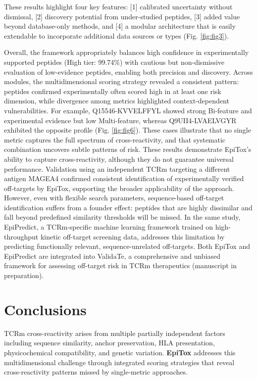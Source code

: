 \documentclass[times, twoside, watermark]{zHenriquesLab-StyleBioRxiv}
\begin{document}
    These results highlight four key features: [1] calibrated uncertainty without dismissal, [2] discovery potential from under-studied peptides, [3] added value beyond database-only methods, and [4] a modular architecture that is easily extendable to incorporate additional data sources or types (Fig. \ref{fig:fig3}). 
    
    Overall, the framework appropriately balances high confidence in experimentally supported peptides (High tier: 99.74\%) with cautious but non-dismissive evaluation of low-evidence peptides, enabling both precision and discovery.
    Across modules, the multidimensional scoring strategy revealed a consistent pattern: peptides confirmed experimentally often scored high in at least one risk dimension, while divergence among metrics highlighted context-dependent vulnerabilities. For example, Q15546-KVVELFFYL showed strong Bi-feature and experimental evidence but low Multi-feature, whereas Q9UII4-LVAELVGYR exhibited the opposite profile (Fig. \ref{fig:fig6}). These cases illustrate that no single metric captures the full spectrum of cross-reactivity, and that systematic combination uncovers subtle patterns of risk.
    These results demonstrate EpiTox’s ability to capture cross-reactivity, although they do not guarantee universal performance. Validation using an independent TCRm targeting a different antigen MAGEA4 \cite{Sinclair2025BeyondSequenceSimilarity} confirmed consistent identification of experimentally verified off-targets by EpiTox, supporting the broader applicability of the approach. However, even with flexible search parameters, sequence-based off-target identification suffers from a founder effect: peptides that are highly dissimilar and fall beyond predefined similarity thresholds will be missed. In the same study, EpiPredict, a TCRm-specific machine learning framework trained on high-throughput kinetic off-target screening data, addresses this limitation by predicting functionally relevant, sequence-unrelated off-targets. Both EpiTox and EpiPredict are integrated into ValidaTe, a comprehensive and unbiased framework for assessing off-target risk in TCRm therapeutics (manuscript in preparation).

\section*{Conclusions}
    TCRm cross-reactivity arises from multiple partially independent factors including sequence similarity, anchor preservation, HLA presentation, physicochemical compatibility, and genetic variation. \textbf{EpiTox} addresses this multidimensional challenge through integrated scoring strategies that reveal cross-reactivity patterns missed by single-metric approaches.
\end{document}
